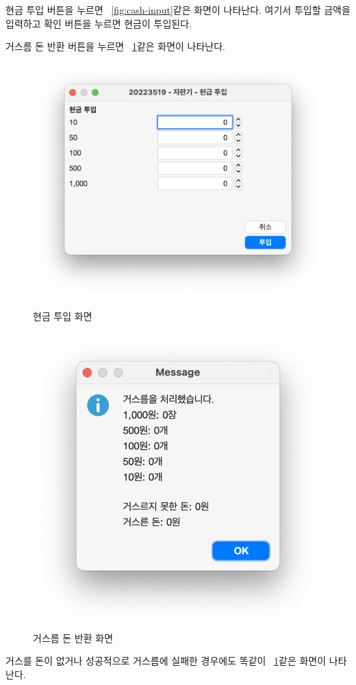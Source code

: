 \documentclass{oblivoir}
\newcommand{\figref}[1]{\figurename~\ref{#1}}
\begin{document}
    현금 투입 버튼을 누르면 \figref{fig:cash-input}\와 같은 화면이 나타난다.
    여기서 투입할 금액을 입력하고 확인 버튼을 누르면 현금이 투입된다.

    거스름 돈 반환 버튼을 누르면 \figref{fig:change}\와 같은 화면이 나타난다.
    \begin{figure}[h]
        \centering
        \begin{minipage}{.5\textwidth}
            \includegraphics[width=\textwidth]{images/snapshot/cash-input}
            \caption{현금 투입 화면}
            \label{fig:cash-input}
        \end{minipage}%
        \begin{minipage}{.5\textwidth}
            \includegraphics[width=\textwidth]{images/snapshot/change}
            \caption{거스름 돈 반환 화면}
            \label{fig:change}
        \end{minipage}
    \end{figure}
    거스를 돈이 없거나 성공적으로 거스름에 실패한 경우에도 똑같이 \figref{fig:change}\와 같은 화면이 나타난다.
\end{document}
